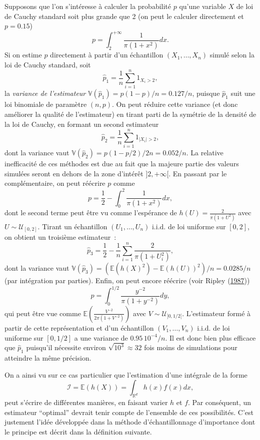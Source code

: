 \begin{exemple}\label{V-loi-de-cauchy-conditionnelle}

Supposons que l'on s'intéresse à calculer la probabilité \(p\) qu'une
variable \(X\) de loi de Cauchy standard soit plus grande que 2 (on peut
le calculer directement et \(p=0.15\))
\[p = \int_2^{+\infty} \frac{1}{\pi(1+x^2)}dx.\] Si on estime \(p\)
directement à partir d'un échantillon \((X_1,\ldots,X_n)\) simulé selon
la loi de Cauchy standard, soit
\[\widehat{p}_1 = \frac{1}{n}\sum_{i=1}^n 1_{X_i > 2},\] la
\emph{variance de l'estimateur}
\(\mathbb{V}(\widehat{p}_1) = p(1-p)/n = 0.127/n\), puisque
\(\widehat{p}_1\) suit une loi binomiale de paramètre \((n,p)\). On peut
réduire cette variance (et donc améliorer la qualité de l'estimateur) en
tirant parti de la symétrie de la densité de la loi de Cauchy, en
formant un second estimateur
\[\widehat{p}_2 = \frac{1}{n}\sum_{i=1}^n 1_{|X_i| > 2},\] dont la
variance vaut \(\mathbb{V}(\widehat{p}_2) = p(1-p/2)/2n = 0.052/n\). La
relative inefficacité de ces méthodes est due au fait que la majeure
partie des valeurs simulées seront en dehors de la zone d'intérêt
\(]2,+\infty[\). En passant par le complémentaire, on peut réécrire
\(p\) comme \[p = \frac{1}{2} - \int_0^2 \frac{1}{\pi(1+x^2)}dx,\] dont
le second terme peut être vu comme l'espérance de
\(h(U) = \frac{2}{\pi(1+U^2)}\) avec \(U\sim \mathcal{U}_{[0,2]}\).
Tirant un échantillon \((U_1,\ldots,U_n)\) i.i.d. de loi uniforme sur
\([0,2]\), on obtient un troisième estimateur~:
\[\widehat{p}_3 = \frac{1}{2} - \frac{1}{n}\sum_{i=1}^n \frac{2}{\pi(1+U_i^2)},\]
dont la variance vaut
\(\mathbb{V}(\widehat{p}_3) = (\mathbb{E}(h(X)^2) - \mathbb{E}(h(U))^2)/n = 0.0285/n\)
(par intégration par parties). Enfin, on peut encore réécrire (voir
Ripley (\protect\hyperlink{refV-ripley}{1987}))
\[p = \int_0^{1/2}\frac{y^{-2}}{\pi(1+y^{-2})}dy,\] qui peut être vue
comme \(\mathbb{E}\left(\frac{V^{-2}}{2\pi(1+V^{-2})}\right)\) avec
\(V\sim \mathcal{U}_{]0,1/2[}\). L'estimateur formé à partir de cette
représentation et d'un échantillon \((V_1,\ldots,V_n)\) i.i.d. de loi
uniforme sur \([0,1/2]\) a une variance de \(0.95\, 10^{-4}/n\). Il est
donc bien plus efficace que \(\widehat{p}_1\) puisqu'il nécessite
environ \(\sqrt{10^3}\approx 32\) fois moins de simulations pour
atteindre la même précision.

On a ainsi vu sur ce cas particulier que l'estimation d'une intégrale de
la forme
\[\mathcal{I}=\mathbb{E}\left(h(X)\right)=\int_{\mathbb{R}^d} h(x) f(x) dx,\]
peut s'écrire de différentes manières, en faisant varier \(h\) et \(f\).
Par conséquent, un estimateur ``optimal'' devrait tenir compte de
l'ensemble de ces possibilités. C'est justement l'idée développée dans
la méthode d'échantillonnage d'importance dont le principe est décrit
dans la définition suivante.
\end{exemple}

